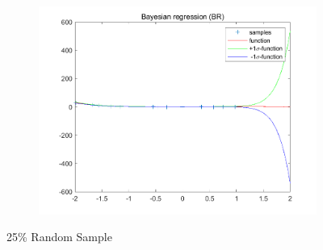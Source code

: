 \documentclass{article}
\begin{document}
\begin{figure}
\begin{subfigure}[b]{0.475\textwidth}
        \includegraphics[width=\textwidth]{fig/1c-25-br.png} 
    \end{subfigure}
    \caption{25\% Random Sample}
\end{figure}
\end{document}
